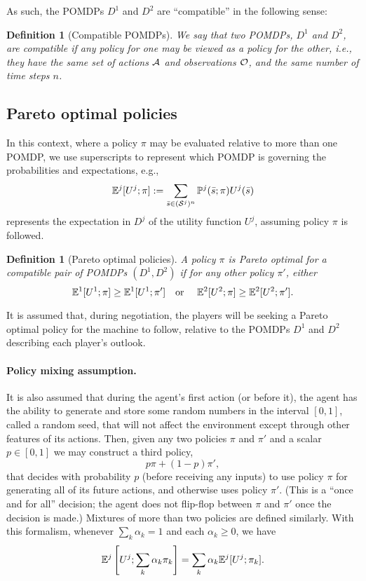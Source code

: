\documentclass{article}  %
\newcommand{\seq}{\bar}
\newtheorem{definition}[theorem]{Definition}
\begin{document}
As such, the POMDPs $D^1$ and $D^2$ are ``compatible'' in the following sense:

\begin{definition}[Compatible POMDPs]  We say that two POMDPs, $D^1$ and $D^2$, are \emph{compatible} if any policy for one may be viewed as a policy for the other, i.e., they have the same set of actions $\mathcal{A}$ and observations $\mathcal{O}$, and the same number of time steps $n$.
\end{definition}

\subsection{Pareto optimal policies}

In this context, where a policy $\pi$ may be evaluated relative to more than one POMDP, we use superscripts to represent which POMDP is governing the probabilities and expectations, e.g.,
\[
\EE^j[U^j; \pi] := \sum_{\seq s \in (\Ss^j)^n} \PP^j(\bar s; \pi) U^j(\bar s)
\]
represents the expectation in $D^j$ of the utility function $U^j$, assuming policy $\pi$ is followed.
\begin{definition}[Pareto optimal policies]  A policy $\pi$ is \emph{Pareto optimal} for a compatible pair of POMDPs $(D^1,D^2)$ if for any other policy $\pi'$, either
\[
\mathbb{E}^1[U^1;\pi] \ge \mathbb{E}^1[U^1;\pi'] \textrm{\quad or \quad} \mathbb{E}^2[U^2;\pi] \ge \mathbb{E}^2[U^2;\pi'].
\]
\end{definition}
%
It is assumed that, during negotiation, the players will be seeking a Pareto optimal policy for the machine to follow, relative to the POMDPs $D^1$ and $D^2$ describing each player's outlook.

\paragraph{Policy mixing assumption.}  It is also assumed that during the agent's first action (or before it), the agent has the ability to generate and store some random numbers in the interval $[0,1]$, called a random seed, that will not affect the environment except through other features of its actions.  Then, given any two policies $\pi$ and $\pi'$ and a scalar $p\in[0,1]$ we may construct a third policy, 
\[
p\pi + (1-p)\pi',
\]
 that decides with probability $p$ (before receiving any inputs) to use policy $\pi$ for generating all of its future actions, and otherwise uses policy $\pi'$.  (This is a ``once and for all'' decision; the agent does not flip-flop between $\pi$ and $\pi'$ once the decision is made.)  Mixtures of more than two policies are defined similarly.  With this formalism, whenever $\sum_k \alpha_k = 1$ and each $\alpha_k\ge 0$, we have
\begin{equation}\label{eqn:linearity}
\mathbb{E}^j\left[U^j ; \sum_k \alpha_k \pi_k\right] = \sum_k \alpha_k \mathbb{E}^j[U^j ; \pi_k].
\end{equation}
\end{document}
